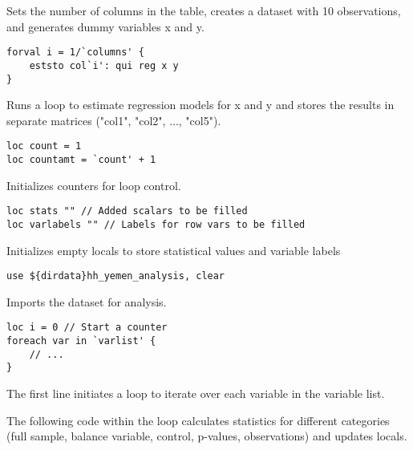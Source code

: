 \documentclass{article}
\begin{document}
Sets the number of columns in the table, creates a dataset with 10 observations, and generates dummy variables x and y.

\begin{mdframed}
\begin{verbatim}
forval i = 1/`columns' {
	eststo col`i': qui reg x y
}
\end{verbatim}
\end{mdframed}

Runs a loop to estimate regression models for x and y and stores the results in separate matrices ("col1", "col2", ..., "col5").

\begin{mdframed}
\begin{verbatim}
loc count = 1
loc countamt = `count' + 1
\end{verbatim}
\end{mdframed}

Initializes counters for loop control.

\begin{mdframed}
\begin{verbatim}
loc stats "" // Added scalars to be filled
loc varlabels "" // Labels for row vars to be filled
\end{verbatim}
\end{mdframed}

Initializes empty locals to store statistical values and variable labels



\begin{mdframed}
\begin{verbatim}
use ${dirdata}hh_yemen_analysis, clear 
\end{verbatim}
\end{mdframed}
Imports the dataset for analysis.


\begin{mdframed}
\begin{verbatim}
loc i = 0 // Start a counter 
foreach var in `varlist' {
    // ...
}
\end{verbatim}
\end{mdframed}

The first line initiates a loop to iterate over each variable in the variable list.

\vspace{1cm} The following code within the loop calculates statistics for different categories (full sample, balance variable, control, p-values, observations) and updates locals.
\end{document}
